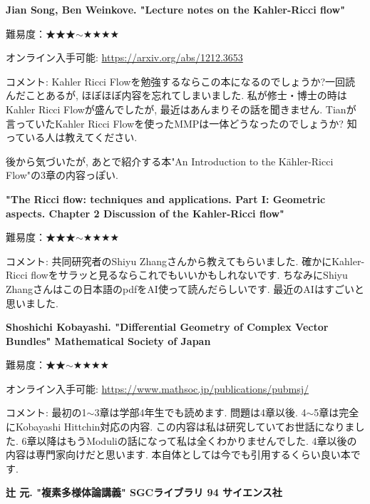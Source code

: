 \textbf{Jian Song, Ben Weinkove. "Lecture notes on the Kahler-Ricci flow"}  \vspace{-6pt} 

難易度：★★★$\sim$★★★★ \vspace{-6pt} 

オンライン入手可能: \url{https://arxiv.org/abs/1212.3653}\vspace{-6pt}

コメント: Kahler Ricci Flowを勉強するならこの本になるのでしょうか?一回読んだことあるが, ほぼほぼ内容を忘れてしまいました. 私が修士・博士の時はKahler Ricci Flowが盛んでしたが, 最近はあんまりその話を聞きません. Tianが言っていたKahler Ricci Flowを使ったMMPは一体どうなったのでしょうか? 知っている人は教えてください. 

後から気づいたが, あとで紹介する本"An Introduction to the Kähler-Ricci Flow"の3章の内容っぽい. 
\vspace{8pt}


\textbf{"The Ricci flow: techniques and applications. Part I: Geometric aspects. Chapter 2 Discussion of the Kahler-Ricci flow" }  \vspace{-6pt} 

難易度：★★★$\sim$★★★★ \vspace{-6pt} 

コメント: 共同研究者のShiyu Zhangさんから教えてもらいました. 確かにKahler-Ricci flowをサラッと見るならこれでもいいかもしれないです. ちなみにShiyu Zhangさんはこの日本語のpdfをAI使って読んだらしいです. 最近のAIはすごいと思いました. 
\vspace{8pt}


\textbf{Shoshichi Kobayashi. "Differential Geometry of Complex Vector Bundles"  Mathematical Society of Japan}  \vspace{-6pt} 

難易度：★★$\sim$★★★★ \vspace{-6pt} 

オンライン入手可能: \url{https://www.mathsoc.jp/publications/pubmsj/}\vspace{-6pt}

コメント: 最初の1$\sim$3章は学部4年生でも読めます. 問題は4章以後.  4$\sim$5章は完全にKobayashi Hittchin対応の内容. この内容は私は研究していてお世話になりました. 6章以降はもうModuliの話になって私は全くわかりませんでした. 4章以後の内容は専門家向けだと思います. 本自体としては今でも引用するくらい良い本です. %
\vspace{8pt}

\textbf{辻 元. "複素多様体論講義" SGCライブラリ 94 サイエンス社}  \vspace{-6pt} 

